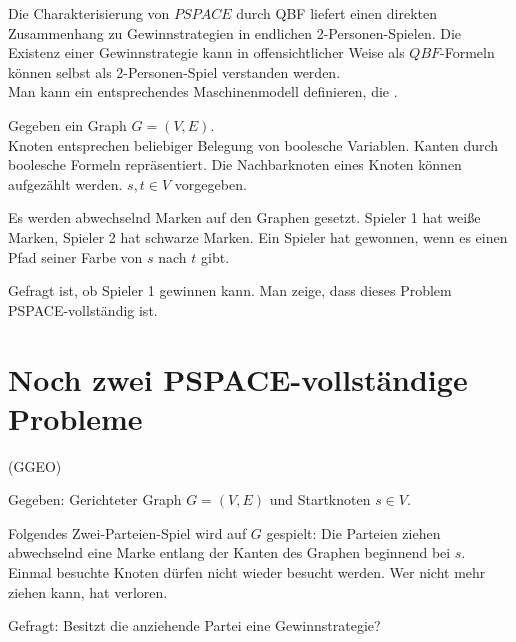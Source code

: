 Die Charakterisierung von $PSPACE$ durch QBF liefert einen direkten Zusammenhang zu Gewinnstrategien in endlichen 2-Personen-Spielen.
Die Existenz einer Gewinnstrategie kann in offensichtlicher Weise als $QBF$-Formeln können selbst als 2-Personen-Spiel verstanden werden.
\\
Man kann ein entsprechendes Maschinenmodell definieren, die .






\begin{beispiel}


    Gegeben ein Graph $G = (V,E)$.
    \\
    Knoten entsprechen beliebiger Belegung von boolesche Variablen. Kanten durch boolesche Formeln repräsentiert. Die Nachbarknoten eines Knoten können aufgezählt werden. $s, t \in V$ vorgegeben.

    Es werden abwechselnd Marken auf den Graphen gesetzt. Spieler 1 hat weiße Marken, Spieler 2 hat schwarze Marken. Ein Spieler hat gewonnen, wenn es einen Pfad seiner Farbe von $s$ nach $t$ gibt.

    Gefragt ist, ob Spieler 1 gewinnen kann. Man zeige, dass dieses Problem PSPACE-vollständig ist.

\end{beispiel}
















\section{Noch zwei PSPACE-vollständige Probleme}


\begin{definition}

     (GGEO)

    Gegeben: Gerichteter Graph $G = (V, E)$ und Startknoten $s \in V$.

    Folgendes Zwei-Parteien-Spiel wird auf $G$ gespielt: Die Parteien ziehen abwechselnd eine Marke entlang der Kanten des Graphen beginnend bei $s$. Einmal besuchte Knoten dürfen nicht wieder besucht werden. Wer nicht mehr ziehen kann, hat verloren.

    Gefragt: Besitzt die anziehende Partei eine Gewinnstrategie?

\end{definition}


